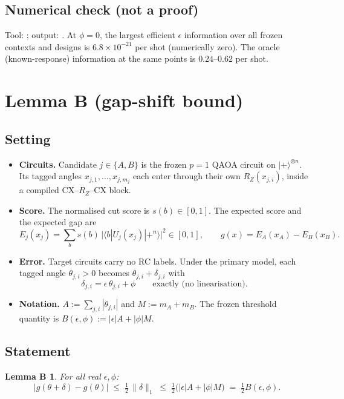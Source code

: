 \documentclass[11pt,a4paper]{article}
\theoremstyle{plain}
\newtheorem*{lemmaB}{Lemma B}
\theoremstyle{definition}
\theoremstyle{remark}
\newcommand{\eps}{\epsilon}
\newcommand{\norm}[1]{\lVert #1\rVert}
\begin{document}
\subsection{Numerical check (not a proof)}
Tool: ; output: .
At $\phi=0$, the largest efficient $\eps$ information over all frozen contexts and designs is
$6.8\times10^{-21}$ per shot (numerically zero). The oracle (known-response) information at the
same points is $0.24$--$0.62$ per shot.

\section{Lemma B (gap-shift bound)}

\subsection{Setting}
\begin{itemize}[leftmargin=*,itemsep=2pt]
\item \textbf{Circuits.} Candidate $j\in\{A,B\}$ is the frozen $p=1$ QAOA circuit on $|+\rangle^{\otimes n}$.
Its tagged angles $x_{j,1},\dots,x_{j,m_j}$ each enter through their own $R_Z(x_{j,i})$, inside a
compiled $\mathrm{CX}$--$R_Z$--$\mathrm{CX}$ block.
\item \textbf{Score.} The normalised cut score is $s(b)\in[0,1]$. The expected score and the expected gap are
\[
E_j(x_j)=\sum_b s(b)\,\big|\langle b|U_j(x_j)|{+}^{n}\rangle\big|^2\in[0,1],\qquad
g(x)=E_A(x_A)-E_B(x_B).
\]
\item \textbf{Error.} Target circuits carry no RC labels. Under the primary model, each tagged angle
$\theta_{j,i}>0$ becomes $\theta_{j,i}+\delta_{j,i}$ with
\[
\delta_{j,i}=\eps\,\theta_{j,i}+\phi\qquad\text{exactly (no linearisation).}
\]
\item \textbf{Notation.} $A:=\sum_{j,i}|\theta_{j,i}|$ and $M:=m_A+m_B$. The frozen threshold quantity is
$B(\eps,\phi):=|\eps|A+|\phi|M$.
\end{itemize}

\subsection{Statement}
\begin{lemmaB}
For all real $\eps,\phi$:
\[
\big|g(\theta+\delta)-g(\theta)\big| \;\le\; \tfrac12\,\norm{\delta}_1 \;\le\; \tfrac12\big(|\eps|A+|\phi|M\big) \;=\; \tfrac12 B(\eps,\phi).
\]
\end{lemmaB}
\end{document}
